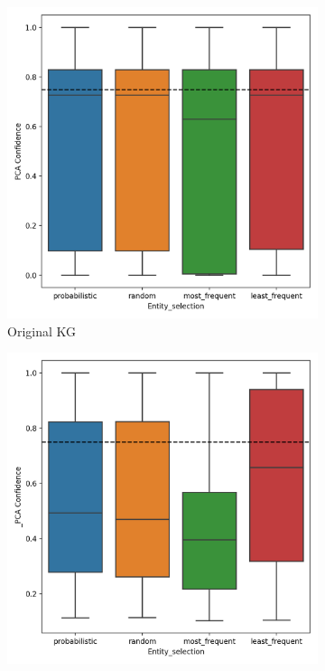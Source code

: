\begin{figure}[htbp]
\centering
\begin{subfigure}{.5\textwidth}
  \centering
  \includegraphics[width=1\linewidth]{figures/results/entity_selection/PCA-entity_wn18rr.png}
  \caption{Original KG}
  \label{fig:PCA-entity_wn18rr_boxplot_sub}
\end{subfigure}%
\begin{subfigure}{.5\textwidth}
  \centering
  \includegraphics[width=1\linewidth]{figures/results/entity_selection/_PCA-entity_wn18rr.png}

\end{subfigure}
\end{figure}
